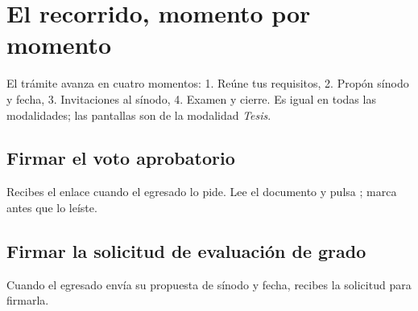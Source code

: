 \section{El recorrido, momento por momento}
El trámite avanza en cuatro momentos: 1. Reúne tus requisitos, 2. Propón sínodo y fecha, 3. Invitaciones al sínodo, 4. Examen y cierre. Es igual en todas las modalidades; las pantallas son de la modalidad \emph{Tesis}.
\subsection{Firmar el voto aprobatorio}
Recibes el enlace cuando el egresado lo pide. Lee el documento y pulsa ; marca antes que lo leíste.
\subsection{Firmar la solicitud de evaluación de grado}
Cuando el egresado envía su propuesta de sínodo y fecha, recibes la solicitud para firmarla.
